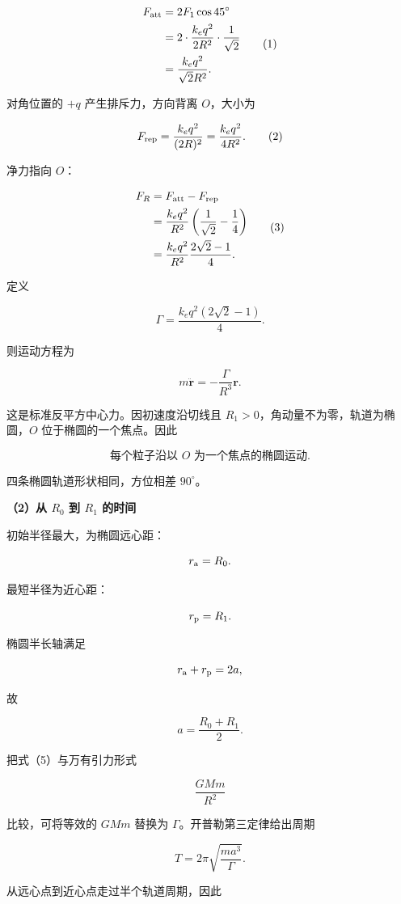 \documentclass[12pt,a4paper,UTF8]{ctexart}
\begin{document}
\[
\begin{aligned}
F_{\rm att}
&=2F_1\cos45^\circ\\
&=2\cdot\frac{k_eq^2}{2R^2}\cdot\frac1{\sqrt2}\\
&=\frac{k_eq^2}{\sqrt2R^2}.
\end{aligned}
\tag{1}
\]

对角位置的 \(+q\) 产生排斥力，方向背离 \(O\)，大小为

\[
F_{\rm rep}
=\frac{k_eq^2}{(2R)^2}
=\frac{k_eq^2}{4R^2}.
\tag{2}
\]

净力指向 \(O\)：

\[
\begin{aligned}
F_R
&=F_{\rm att}-F_{\rm rep}\\
&=\frac{k_eq^2}{R^2}
\left(\frac1{\sqrt2}-\frac14\right)\\
&=\frac{k_eq^2}{R^2}\frac{2\sqrt2-1}{4}.
\end{aligned}
\tag{3}
\]

定义

\[
\Gamma=\frac{k_eq^2(2\sqrt2-1)}4.
\tag{4}
\]

则运动方程为

\[
m\ddot{\bm r}
=-\frac{\Gamma}{R^3}\bm r.
\tag{5}
\]

这是标准反平方中心力。因初速度沿切线且
\(R_1>0\)，角动量不为零，轨道为椭圆，\(O\) 位于椭圆的一个焦点。因此

\[
\boxed{\text{每个粒子沿以 }O\text{ 为一个焦点的椭圆运动}}.
\tag{6}
\]

四条椭圆轨道形状相同，方位相差 \(90^\circ\)。

\textbf{（2）从 \(R_0\) 到 \(R_1\) 的时间}

初始半径最大，为椭圆远心距：

\[
r_{\rm a}=R_0.
\]

最短半径为近心距：

\[
r_{\rm p}=R_1.
\]

椭圆半长轴满足

\[
r_{\rm a}+r_{\rm p}=2a,
\]

故

\[
a=\frac{R_0+R_1}{2}.
\tag{7}
\]

把式（5）与万有引力形式

\[
\frac{GMm}{R^2}
\]

比较，可将等效的 \(GMm\) 替换为 \(\Gamma\)。开普勒第三定律给出周期

\[
T=2\pi\sqrt{\frac{ma^3}{\Gamma}}.
\tag{8}
\]

从远心点到近心点走过半个轨道周期，因此
\end{document}

